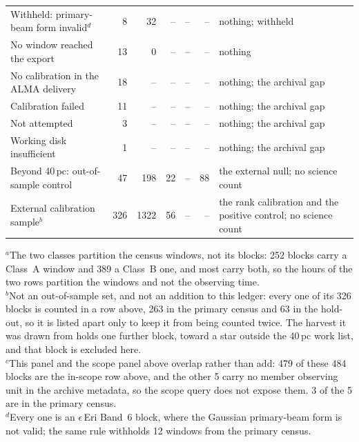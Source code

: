 \begin{tabular}{@{}p{}rrrrrp{}@{}}
\hspace{2.2em}Withheld: primary-beam form invalid$^{d}$ & 8 & 32 & -- & -- & -- & nothing; withheld \\
\hspace{2.2em}No window reached the export & 13 & 0 & -- & -- & -- & nothing \\
\hspace{1.1em}No calibration in the ALMA delivery & 18 & -- & -- & -- & -- & nothing; the archival gap \\
\hspace{1.1em}Calibration failed & 11 & -- & -- & -- & -- & nothing; the archival gap \\
\hspace{1.1em}Not attempted & 3 & -- & -- & -- & -- & nothing; the archival gap \\
\hspace{1.1em}Working disk insufficient & 1 & -- & -- & -- & -- & nothing; the archival gap \\
\hline
Beyond 40\,pc: out-of-sample control & 47 & 198 & 22 & -- & 88 & the external null; no science count \\
External calibration sample$^{b}$ & 326 & 1322 & 56 & -- & -- & the rank calibration and the positive control; no science count \\
\hline
\end{tabular}

{\footnotesize $^{a}$The two classes partition the census windows, not its blocks: 252 blocks carry a Class~A window and 389 a Class~B one, and most carry both, so the hours of the two rows partition the windows and not the observing time.\\ $^{b}$Not an out-of-sample set, and not an addition to this ledger: every one of its 326 blocks is counted in a row above, 263 in the primary census and 63 in the hold-out, so it is listed apart only to keep it from being counted twice. The harvest it was drawn from holds one further block, toward a star outside the 40\,pc work list, and that block is excluded here.\\ $^{c}$This panel and the scope panel above overlap rather than add: 479 of these 484 blocks are the in-scope row above, and the other 5 carry no member observing unit in the archive metadata, so the scope query does not expose them. 3 of the 5 are in the primary census.\\ $^{d}$Every one is an $\epsilon$\,Eri Band~6 block, where the Gaussian primary-beam form is not valid; the same rule withholds 12 windows from the primary census.}
